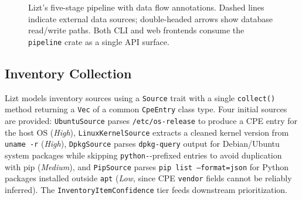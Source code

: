 \documentclass[conference]{IEEEtran}
\begin{document}
\begin{figure}[t]
{
  }
  \caption{Lizt's five-stage pipeline with data flow annotations.
    Dashed lines indicate external data sources; double-headed
    arrows show database read/write paths. Both CLI and web
    frontends consume the \texttt{pipeline} crate as a single
    API surface.}
  \label{fig:pipeline-expanded}
\end{figure}

\subsection{Inventory Collection}
Lizt models inventory sources using a \texttt{Source} trait with a single \texttt{collect()} method returning a \texttt{Vec} of a common \texttt{CpeEntry} class type.
Four initial sources are provided: \texttt{UbuntuSource} parses \texttt{/etc/os-release} to produce a CPE entry for the host OS (\emph{High}), \texttt{LinuxKernelSource} extracts a cleaned kernel version from \texttt{uname -r} (\emph{High}), \texttt{DpkgSource} parses \texttt{dpkg-query} output for Debian/Ubuntu system packages while skipping \texttt{python-}-prefixed entries to avoid duplication with pip (\emph{Medium}), and \texttt{PipSource} parses \texttt{pip list --format=json} for Python packages installed outside \texttt{apt} (\emph{Low}, since CPE \texttt{vendor} fields cannot be reliably inferred).
The \texttt{InventoryItemConfidence} tier feeds downstream prioritization.
\end{document}
